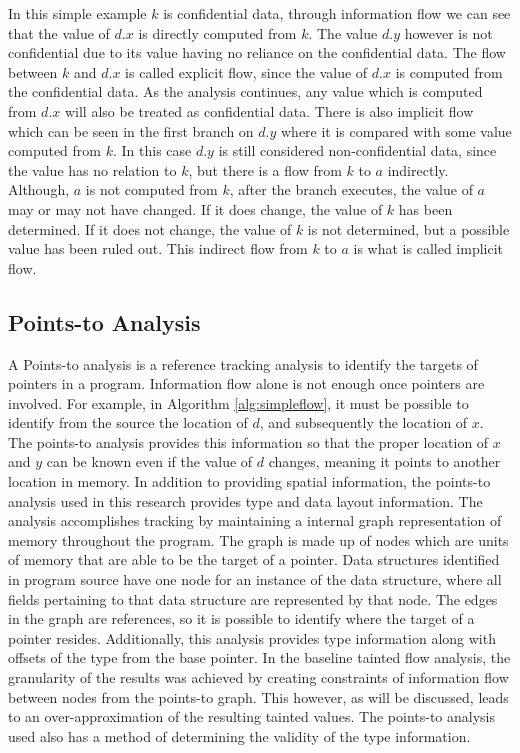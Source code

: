 \documentclass[11pt,a4paper]{article}
\begin{document}
In this simple example $k$ is confidential data, through information flow we
can see that the value of $d.x$ is directly computed from $k$. The value $d.y$
however is not confidential due to its value having no reliance on the
confidential data. The flow between $k$ and $d.x$ is called explicit flow,
since the value of $d.x$ is computed from the confidential data. As the
analysis continues, any value which is computed from $d.x$ will also be
treated as confidential data. There is also implicit flow which can be seen in
the first branch on $d.y$ where it is compared with some value computed from
$k$. In this case $d.y$ is still considered non-confidential data, since the
value has no relation to $k$, but there is a flow from $k$ to $a$ indirectly.
Although, $a$ is not computed from $k$, after the branch executes, the value
of $a$ may or may not have changed. If it does change, the value of $k$ has been
determined. If it does not change, the value of $k$ is not determined, but a
possible value has been ruled out. This indirect flow from $k$ to $a$ is what
is called implicit flow.
\subsection{Points-to Analysis}

A Points-to analysis is a reference tracking analysis to identify the targets of
pointers in a program. Information flow alone is not enough once pointers are
involved. For example, in Algorithm \ref{alg:simpleflow}, it must be possible to
identify from the source the location of $d$, and subsequently the location of
$x$. The points-to analysis provides this information so that the proper
location of $x$ and $y$ can be known even if the value of $d$ changes, meaning
it points to another location in memory. In addition to providing spatial
information, the points-to analysis used in this research provides type and data
layout information. The analysis accomplishes tracking by maintaining a internal
graph representation of memory throughout the program. The graph is made up of
nodes which are units of memory that are able to be the target of a pointer.
Data structures identified in program source have one node for an instance of
the data structure, where all fields pertaining to that data structure are
represented by that node. The edges in the graph are references, so it is
possible to identify where the target of a pointer resides. Additionally, this
analysis provides type information along with offsets of the type from the base
pointer. In the baseline tainted flow analysis, the granularity of the results
was achieved by creating  constraints of information flow between nodes from the
points-to graph. This however, as will be discussed, leads to an
over-approximation of the resulting tainted values. The points-to analysis used
also has a method of determining the validity of the type information. 
\end{document}
